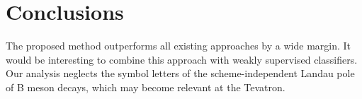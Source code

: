 \section{Conclusions}\label{sec:conclusions}

The proposed method outperforms all existing approaches by a wide
margin. It would be interesting to combine this approach with weakly
supervised classifiers. Our analysis neglects the symbol letters of the
scheme-independent Landau pole of B meson decays, which may become
relevant at the Tevatron.

